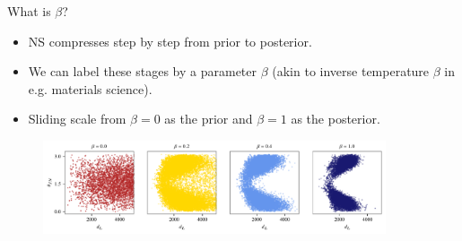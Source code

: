 \documentclass[aspectratio=169, 11pt]{beamer}
\begin{document}
\begin{frame}{What is $\beta$?}
\begin{itemize}\vspace{2em}
    \item NS compresses step by step from prior to posterior.
    \item We can label these stages by a parameter $\beta$ (akin to inverse temperature $\beta$ in e.g. materials science). 
    \item Sliding scale from $\beta = 0$ as the prior and $\beta = 1$ as the posterior. 
\end{itemize}
\begin{figure}
    \centering
    \includegraphics[width=0.9\textwidth]{Ca_Foscari Beamer/presentation_beta_extrinsic.pdf}
\end{figure}

\end{frame}
\end{document}
